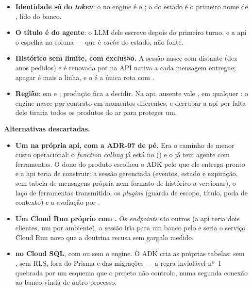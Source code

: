 \begin{itemize}
    \emph{e} ; outro dono é 404.
  \item \textbf{Identidade só do \emph{token}}: o  no engine é o
    ; o  do estado é o primeiro nome de
    , lido do banco.
  \item \textbf{O título é do agente}: o LLM dele escreve
     depois do primeiro turno, e a api o espelha na
    coluna  --- que é \emph{cache} do estado, não fonte.
  \item \textbf{Histórico sem limite, com exclusão.} A sessão nasce com
     distante (dez anos pedidos) e é renovada por
     na API nativa a cada
    mensagem entregue; apagar é  mais a linha, e o
     é a única rota com .
  \item \textbf{Região}:  em  e ; produção fica a
    decidir. Na api,  ausente vale , em
    qualquer : o engine nasce por contrato em momentos diferentes,
    e derrubar a api por falta dele tiraria todos os produtos do ar para
    proteger um.
\end{itemize}

\textbf{Alternativas descartadas.}

\begin{itemize}
  \item \textbf{Um  na própria api, com a ADR-07 de pé.} Era o
    caminho de menor custo operacional: o \emph{function calling} já está no
     () e o  já tem agente com
    ferramentas. O dono do produto escolheu o ADK pelo que ele entrega pronto e
    a api teria de construir: a sessão gerenciada (eventos, estado e expiração,
    sem tabela de mensagens própria nem formato de histórico a versionar), o
    laço de ferramentas transmitido, os \emph{plugins} (guarda de escopo, título,
    poda de contexto) e a avaliação por .
  \item \textbf{Um Cloud Run próprio com .} Os
    \emph{endpoints} são outros (a api teria dois clientes, um por ambiente), a
    sessão iria para um banco pelo  e seria o serviço
    Cloud Run novo que a doutrina recusa sem gargalo medido.
  \item \textbf{ no Cloud SQL}, com ou sem o engine.
    O ADK cria as próprias tabelas: sem , sem RLS, fora do Prisma e
    das migrações --- a regra inviolável nº~1 quebrada por um esquema que o
    projeto não controla, numa segunda conexão ao banco vinda de outro processo.
\end{itemize}

